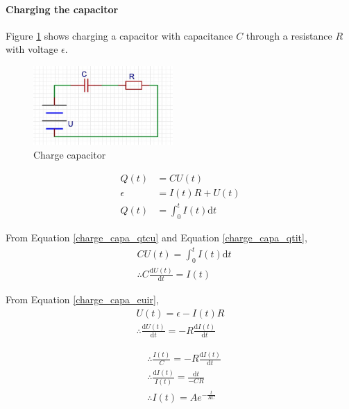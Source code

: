         \paragraph{Charging the capacitor}
            Figure \ref{charge_capa} shows charging a capacitor with capacitance $C$ through a resistance $R$ with voltage $\epsilon$.

            \begin{figure}[H]
                \begin{center}
                    \includegraphics[height=3cm]{electromagnetism_charts/charge_capa.eps}
                \end{center}
                \caption{Charge capacitor}
                \label{charge_capa}
            \end{figure}

            \begin{align}
                Q(t) &= C U(t) \label{charge_capa_qtcu} \\ 
                \epsilon &= I(t) R + U(t) \label{charge_capa_euir}\\
                Q(t) &= \int_{0}^{t} I(t) \mathrm{d} t \label{charge_capa_qtit}
            \end{align}

            From Equation \ref{charge_capa_qtcu} and Equation \ref{charge_capa_qtit}, 
            \begin{align}
                & C U(t) = \int_{0}^{t} I(t) \mathrm{d} t \\
                & \therefore C \frac{\mathrm{d} U(t)}{\mathrm{d} t} = I(t)
            \end{align}

            From Equation \ref{charge_capa_euir},
            \begin{align}
                U(t) = \epsilon - I(t) R \\
                \therefore \frac{\mathrm{d} U(t)}{\mathrm{d} t} = -R \frac{\mathrm{d} I(t)}{\mathrm{d} t}
            \end{align}

            \begin{align}
                & \therefore \frac{I(t)}{C} = - R \frac{\mathrm{d} I(t)}{\mathrm{d} t} \\
                & \therefore \frac{\mathrm{d} I(t)}{I(t)} = \frac{\mathrm{d} t}{- C R} \\
                & \therefore I(t) = A e^{- \frac{t}{RC}}
            \end{align}


